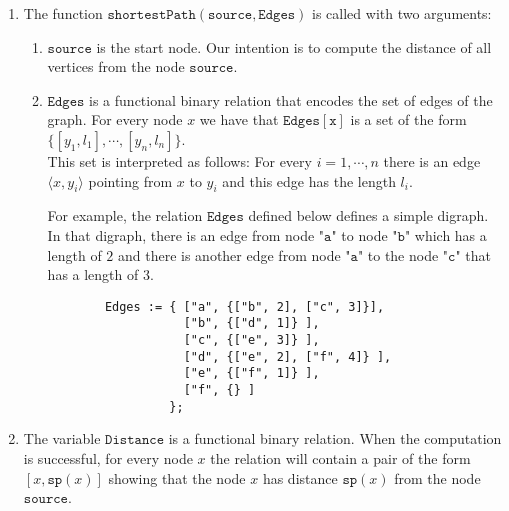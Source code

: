 \noindent
\begin{enumerate}
\item The function $\mathtt{shortestPath}(\mathtt{source}, \mathtt{Edges})$ is called with two arguments:
      \begin{enumerate}
      \item $\mathtt{source}$ is the start node.  Our intention is to compute the distance of all
            vertices from the node $\mathtt{source}$.
      \item $\mathtt{Edges}$ is a functional binary relation that encodes the set of edges of the graph.  For
            every node $x$ we have that $\mathtt{Edges}[\mathtt{x}]$ is a set of the form
            \\[0.2cm]
            \hspace*{1.3cm}
            $\{ [y_1, l_1], \cdots, [y_n, l_n] \}$.
            \\[0.2cm]
            This set is interpreted as follows: For every $i = 1,\cdots,n$ there is an edge
            $\langle x, y_i \rangle$ pointing from $x$ to $y_i$ and this edge has the length $l_i$.

            For example, the relation $\mathtt{Edges}$ defined below defines a simple digraph.
            In that digraph, there is an edge from node $\texttt{"a"}$ to node $\texttt{"b"}$ which has a
            length of $2$ and there is another edge from node $\texttt{"a"}$ to the node $\texttt{"c"}$ that has a length of $3$.
            \begin{verbatim}
        Edges := { ["a", {["b", 2], ["c", 3]}], 
                   ["b", {["d", 1]} ],
                   ["c", {["e", 3]} ],  
                   ["d", {["e", 2], ["f", 4]} ],  
                   ["e", {["f", 1]} ],
                   ["f", {} ]
                 };
           \end{verbatim}
      \end{enumerate}
\item The variable $\mathtt{Distance}$ is a functional binary relation.  When the computation is
      successful, for every node $x$ the relation will contain a pair of the form
      $[x, \mathtt{sp}(x)]$ showing that the node $x$ has distance $\mathtt{sp}(x)$ from the node $\mathtt{source}$.


\end{enumerate}

